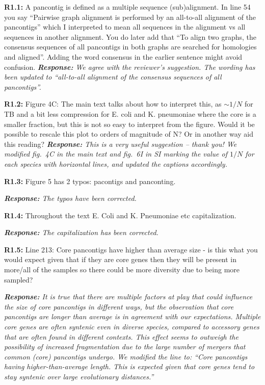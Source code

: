 \documentclass[aps,rmp,onecolumn]{revtex4-1}
\newcommand{\reviewer}[2]{\textbf{#1:} #2\vskip 5mm}
\newcommand{\response}[1]{{\it {\color{response}\textbf{Response:} #1}}\vskip 5mm}
\newcommand{\SIfigBenchmark}{6}
\begin{document}
\reviewer{R1.1}{A pancontig is defined as a multiple sequence (sub)alignment. In line 54 you say ``Pairwise graph alignment is performed by an all-to-all alignment of the pancontigs'' which I interpreted to mean all sequences in the alignment vs all sequences in another alignment. You do later add that ``To align two graphs, the consensus sequences of all pancontigs in both graphs are searched for homologies and aligned''. Adding the word consensus in the earlier sentence might avoid confusion.}
\response{We agree with the reviewer's suggestion. The wording has been updated to ``all-to-all alignment of the consensus sequences of all \textit{pancontigs}''.}

\reviewer{R1.2}{Figure 4C: The main text talks about how to interpret this, as $\sim 1/N$ for TB and a bit less compression for E. coli and K. pneumoniae where the core is a smaller fraction, but this is not so easy to interpret from the figure. Would it be possible to rescale this plot to orders of magnitude of N? Or in another way aid this reading?}
\response{This is a very useful suggestion -- thank you! We modified fig.~4C in the main text and fig.~{\SIfigBenchmark}I in SI marking the value of $1/N$ for each species with horizontal lines, and updated the captions accordingly.}

\reviewer{R1.3}{Figure 5 has 2 typos: pacontigs and panconting.}

\response{The typos have been corrected.}

\reviewer{R1.4}{Throughout the text E. Coli and K. Pneumoniae etc capitalization.}

\response{The capitalization has been corrected.}

\reviewer{R1.5}{Line 213: Core pancontigs have higher than average size - is this what you would expect given that if they are core genes then they will be present in more/all of the samples so there could be more diversity due to being more sampled?}

\response{It is true that there are multiple factors at play that could influence the size of core pancontigs in different ways, but the observation that core pancontigs are longer than average is in agreement with our expectations. Multiple core genes are often syntenic even in diverse species, compared to accessory genes that are often found in different contexts. This effect seems to outweigh the possibility of increased fragmentation due to the large number of mergers that common (core) pancontigs undergo.
We modified the line to: ``Core pancontigs having higher-than-average length. This is expected given that core genes tend to stay syntenic over large evolutionary distances.''}
\end{document}
